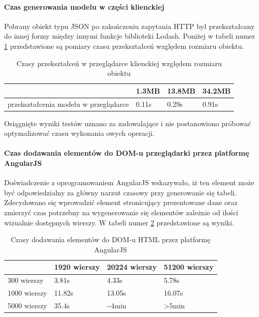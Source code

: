 \documentclass[a4paper,12pt,twoside]{article}
\begin{document}
\paragraph{Czas generowania modelu w części klienckiej} Pobrany obiekt typu JSON
po zakończeniu zapytania HTTP był przekształcany do innej formy między innymi
funkcje biblioteki Lodash. Poniżej w tabeli numer \ref{table:lodashTime} przedstawione są pomiary czasu przekształceń względem rozmiaru obiektu.

\begin{table} [H]
\begin{tabular}{| p{3cm} | p{3cm} | p{3cm} | p{3cm}|}
\hline
& 1.3MB&13.8MB& 34.2MB\\
\hline
przekształcenia modelu w przeglądarce& 0.11s & 0.29s& 0.91s\\ \hline
\end{tabular}
\caption{Czasy przekształceń w przeglądarce klienckiej względem rozmiaru obiektu}
\label{table:lodashTime}
\end{table}
Osiągnięte wyniki testów uznano za zadowalające i nie postanowiono
próbować optymalizować czasu wykonania owych operacji.

\paragraph{Czas dodawania elementów do DOM-u przeglądarki przez platformę AngularJS}
Doświadczenie z oprogramowaniem AngularJS wskazywało, iż ten element może być odpowiedzialny za główny narzut czasowy przy generowanie się tabeli.
Zdecydowano się wprowadzić element stronicujący prezentowane dane oraz
zmierzyć czas potrzebny na wygenerowanie się elementów zależnie od ilości
wizualnie dostępnych wierszy. W tabeli numer \ref{table:tableRender} przedstawione są
wyniki.

\begin{table} [H]
\begin{tabular}{| p{3cm} | p{3cm} | p{3cm} | p{3cm}|}
\hline
& 1920 wierszy & 20224 wierszy & 51200 wierszy\\
\hline
300 wierszy& 3.81s & 4.33s& 5.78s\\ \hline
1000 wierszy& 11.82s & 13.05s& 16.07s\\ \hline
5000 wierszy& 35.4s & \textasciitilde 4min& >5min\\ \hline
\end{tabular}
\caption{Czasy dodawania elementów do DOM-u HTML przez platformę AngularJS}
\label{table:tableRender}
\end{table}
\newpage
\end{document}
